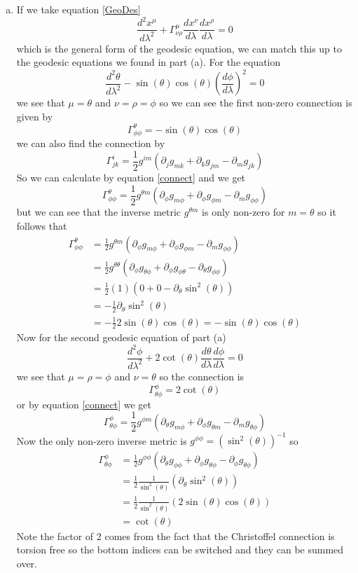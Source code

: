 \documentclass[11pt]{article}
\numberwithin{equation}{section}
\begin{document}
\begin{enumerate}[(a)]
\item
If we take equation \ref{GeoDes}
$$\frac{d^2x^{\mu}}{d\lambda^2} + \Gamma^{\mu}_{\nu\rho}\frac{dx^{\nu}}{d\lambda}\frac{dx^{\rho}}{d\lambda} = 0$$
which is the general form of the geodesic equation, we can match this up to the geodesic equations we found in part (a). For the equation
$$\frac{d^2\theta}{d\lambda^2} - \sin(\theta)\cos(\theta)\left(\frac{d\phi}{d\lambda}\right)^2 = 0$$
we see that $\mu=\theta$ and $\nu=\rho=\phi$ so we can see the first non-zero connection is given by
$$\Gamma^{\theta}_{\phi\phi} = -\sin(\theta)\cos(\theta)$$
we can also find the connection by 
\begin{equation}
\Gamma^{i}_{jk} = \frac{1}{2}g^{im}\left(\partial_{j}g_{mk}+\partial_{k}g_{jm} - \partial_{m}g_{jk}\right)
\label{connect}
\end{equation}
So we can calculate by equation \ref{connect} and we get
$$\Gamma^{\theta}_{\phi\phi} = \frac{1}{2}g^{\theta m}\left(\partial_{\phi}g_{m\phi}+\partial_{\phi}g_{\phi m} - \partial_{m}g_{\phi\phi}\right)$$
but we can see that the inverse metric $g^{\theta m}$ is only non-zero for $m=\theta$ so it follows that
\begin{align*}
\Gamma^{\theta}_{\phi\phi} &= \frac{1}{2}g^{\theta m}\left(\partial_{\phi}g_{m\phi}+\partial_{\phi}g_{\phi m} - \partial_{m}g_{\phi\phi}\right)\\
&= \frac{1}{2}g^{\theta \theta}\left(\partial_{\phi}g_{\theta\phi}+\partial_{\phi}g_{\phi \theta} - \partial_{\theta}g_{\phi\phi}\right)\\
&= \frac{1}{2}(1)\left(0+0- \partial_{\theta}\sin^2(\theta)\right)\\
&= -\frac{1}{2}\partial_{\theta}\sin^2(\theta)\\
&= -\frac{1}{2}2\sin(\theta)\cos(\theta) = -\sin(\theta)\cos(\theta)
\end{align*}
Now for the second geodesic equation of part (a)
$$\frac{d^2\phi}{d\lambda^2} + 2\cot(\theta)\frac{d\theta}{d\lambda}\frac{d\phi}{d\lambda}  = 0$$
we see that $\mu=\rho=\phi$ and $\nu=\theta$ so the connection is
$$\Gamma^{\phi}_{\theta\phi} = 2\cot(\theta)$$
or by equation \ref{connect} we get
$$\Gamma^{\phi}_{\theta\phi} = \frac{1}{2}g^{\phi m}\left(\partial_{\theta}g_{m\phi}+\partial_{\phi}g_{\theta m} - \partial_{m}g_{\theta\phi}\right)$$
Now the only non-zero inverse metric is $g^{\phi\phi} = \left(\sin^2(\theta)\right)^{-1}$ so
\begin{align*}
\Gamma^{\phi}_{\theta\phi} &= \frac{1}{2}g^{\phi \phi}\left(\partial_{\theta}g_{\phi\phi}+\partial_{\phi}g_{\theta \phi} - \partial_{\phi}g_{\theta\phi}\right)\\
&= \frac{1}{2}\frac{1}{\sin^2(\theta)}\left(\partial_{\theta}\sin^2(\theta)\right)\\
&= \frac{1}{2}\frac{1}{\sin^2(\theta)}\left(2\sin(\theta)\cos(\theta)\right)\\
&= \cot(\theta)
\end{align*}
Note the factor of 2 comes from the fact that the Christoffel connection is torsion free so the bottom indices can be switched and they can be summed over.


\end{enumerate}
\end{document}
